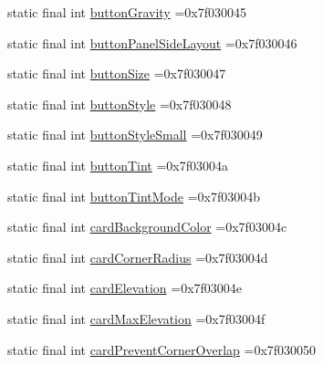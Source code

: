 \begin{DoxyCompactItemize}
\item 
static final int \mbox{\hyperlink{classbr_1_1unb_1_1cic_1_1mp_1_1marketmaster_1_1test_1_1R_1_1attr_aada56bae62444d2739935881c3c1f6ae}{button\+Gravity}} =0x7f030045
\item 
static final int \mbox{\hyperlink{classbr_1_1unb_1_1cic_1_1mp_1_1marketmaster_1_1test_1_1R_1_1attr_ae105af850ad4bbc21de661dd4fd14e8a}{button\+Panel\+Side\+Layout}} =0x7f030046
\item 
static final int \mbox{\hyperlink{classbr_1_1unb_1_1cic_1_1mp_1_1marketmaster_1_1test_1_1R_1_1attr_aafdfb0fb0e035fb86f8936569ae82a95}{button\+Size}} =0x7f030047
\item 
static final int \mbox{\hyperlink{classbr_1_1unb_1_1cic_1_1mp_1_1marketmaster_1_1test_1_1R_1_1attr_a16e00fd2de38e35dec69b5900bf57eeb}{button\+Style}} =0x7f030048
\item 
static final int \mbox{\hyperlink{classbr_1_1unb_1_1cic_1_1mp_1_1marketmaster_1_1test_1_1R_1_1attr_ae568b405faa108daff8605f215ae5e83}{button\+Style\+Small}} =0x7f030049
\item 
static final int \mbox{\hyperlink{classbr_1_1unb_1_1cic_1_1mp_1_1marketmaster_1_1test_1_1R_1_1attr_a21dadafeebd8c221d5552a7f6a6e6adb}{button\+Tint}} =0x7f03004a
\item 
static final int \mbox{\hyperlink{classbr_1_1unb_1_1cic_1_1mp_1_1marketmaster_1_1test_1_1R_1_1attr_af61cb5cdc9714573e1e7eaa87f34a9a3}{button\+Tint\+Mode}} =0x7f03004b
\item 
static final int \mbox{\hyperlink{classbr_1_1unb_1_1cic_1_1mp_1_1marketmaster_1_1test_1_1R_1_1attr_a2edabc305e69f461342fff97432617fb}{card\+Background\+Color}} =0x7f03004c
\item 
static final int \mbox{\hyperlink{classbr_1_1unb_1_1cic_1_1mp_1_1marketmaster_1_1test_1_1R_1_1attr_aad1f54004e9fb734709ca28348126df3}{card\+Corner\+Radius}} =0x7f03004d
\item 
static final int \mbox{\hyperlink{classbr_1_1unb_1_1cic_1_1mp_1_1marketmaster_1_1test_1_1R_1_1attr_a93436d5dea67fba1599c96fa8abd9d79}{card\+Elevation}} =0x7f03004e
\item 
static final int \mbox{\hyperlink{classbr_1_1unb_1_1cic_1_1mp_1_1marketmaster_1_1test_1_1R_1_1attr_a8bc947cf5c7b3eb1b6f71b5af1f779d8}{card\+Max\+Elevation}} =0x7f03004f
\item 
static final int \mbox{\hyperlink{classbr_1_1unb_1_1cic_1_1mp_1_1marketmaster_1_1test_1_1R_1_1attr_a257aa71ec13f12ce3d78ca0fddc56e03}{card\+Prevent\+Corner\+Overlap}} =0x7f030050
\item 

\end{DoxyCompactItemize}
